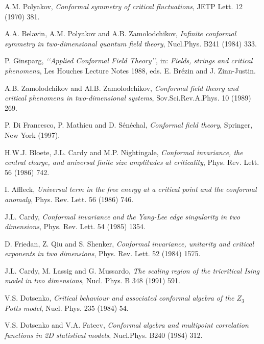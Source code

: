 \documentclass[a4paper,12pt]{report}
\begin{document}
\begin{thebibliography}{23}







 A.M. Polyakov, \textit{Conformal symmetry of critical fluctuations}, JETP Lett. 12 (1970) 381.

 A.A. Belavin, A.M. Polyakov and A.B. Zamolodchikov, \textit{Infinite conformal symmetry in two-dimensional quantum field theory}, Nucl.Phys. B241 (1984) 333.

 P. Ginsparg, \textit{\lq\lq Applied Conformal Field Theory\rq\rq}, in: \textit{Fields, strings and critical
phenomena}, Les Houches Lecture Notes 1988, eds. E. Br\'ezin and J. Zinn-Justin.

 A.B. Zamolodchikov and Al.B. Zamolodchikov, \textit{Conformal field theory and critical phenomena in two-dimensional systems}, Sov.Sci.Rev.A.Phys. 10 (1989) 269.

 P. Di Francesco, P. Mathieu and D. S\'en\'echal, \textit{Conformal field theory}, Springer, New York (1997).

 H.W.J. Bloete, J.L. Cardy and M.P. Nightingale, \textit{Conformal invariance, the central charge,
and universal finite size amplitudes at criticality}, Phys. Rev. Lett. 56 (1986) 742.

 I. Affleck, \textit{Universal term in the free energy at a critical point and the conformal anomaly},
Phys. Rev. Lett. 56 (1986) 746.

 J.L. Cardy, \textit{Conformal invariance and the Yang-Lee edge singularity in two dimensions}, Phys. Rev. Lett. 54 (1985) 1354.

 D. Friedan, Z. Qiu and S. Shenker, \textit{Conformal invariance, unitarity and critical
exponents in two dimensions}, Phys. Rev. Lett. 52 (1984) 1575.

 J.L. Cardy, M. Lassig and G. Mussardo, \textit{The scaling region of the tricritical Ising model in two dimensions}, Nucl. Phys. B 348 (1991) 591.

 V.S. Dotsenko, \textit{Critical behaviour and associated conformal algebra of the $Z_{3}$ Potts model}, Nucl. Phys. 235 (1984) 54.


 V.S. Dotsenko and V.A. Fateev, \textit{Conformal algebra and multipoint correlation functions in 2D statistical models}, Nucl.Phys. B240 (1984)
312.


\end{thebibliography}
\end{document}
